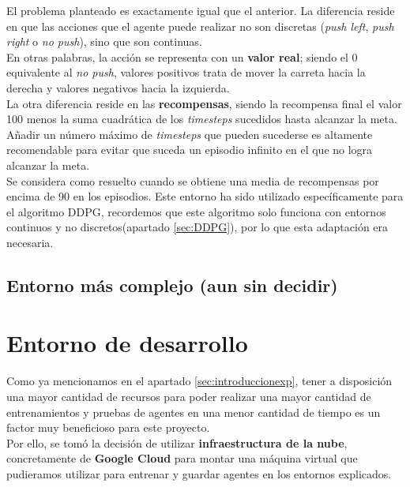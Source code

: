 \documentclass[11pt,fleqn]{book} %
\begin{document}
El problema planteado es exactamente igual que el anterior. La diferencia reside en que las acciones que el agente puede realizar no son discretas (\textit{push left}, \textit{push right} o \textit{no push}), sino que son continuas. \\

En otras palabras, la acción se representa con un \textbf{valor real}; siendo el 0 equivalente al \textit{no push}, valores positivos trata de mover la carreta hacia la derecha y valores negativos hacia la izquierda. \\

La otra diferencia reside en las \textbf{recompensas}, siendo la recompensa final el valor 100 menos la suma cuadrática de los \textit{timesteps} sucedidos hasta alcanzar la meta. Añadir un número máximo de \textit{timesteps} que pueden sucederse es altamente recomendable para evitar que suceda un episodio infinito en el que no logra alcanzar la meta. \\

Se considera como resuelto cuando se obtiene una media de recompensas por encima de 90 en los episodios. Este entorno ha sido utilizado específicamente para el algoritmo DDPG, recordemos que este algoritmo solo funciona con entornos continuos y no discretos(apartado \ref{sec:DDPG}), por lo que esta adaptación era necesaria.\cite{article:mountaincontinuous}

\section{Entorno más complejo (aun sin decidir)}

\chapter{Entorno de desarrollo}\label{sec:cloud}

Como ya mencionamos en el apartado \ref{sec:introduccionexp}, tener a disposición una mayor cantidad de recursos para poder realizar una mayor cantidad de entrenamientos y pruebas de agentes en una menor cantidad de tiempo es un factor muy beneficioso para este proyecto. \\

Por ello, se tomó la decisión de utilizar \textbf{infraestructura de la nube}, concretamente de \textbf{Google Cloud} para montar una máquina virtual que pudieramos utilizar para entrenar y guardar agentes en los entornos explicados. 
\end{document}
